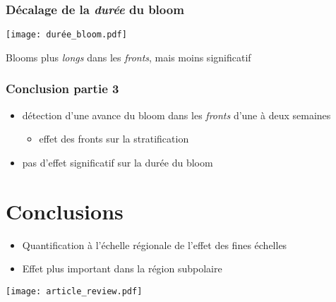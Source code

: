 \documentclass[11pt, french, aspectratio=32]{beamer}
\begin{document}

\begin{frame}
  \frametitle{Décalage de la \emph{\textit{durée}} du bloom}
  \texttt{[image: durée\_bloom.pdf]}

  \vfill

  Blooms plus \emph{longs} dans les \emph{fronts}, mais moins significatif
\end{frame}


\begin{frame}
  \frametitle{Conclusion partie 3}
  \vfill
  \begin{itemize}
          \setlength{\itemsep}{3em}
    \item détection d'une avance du bloom dans les \emph{fronts} d'une à deux semaines
          \begin{itemize}
            \item effet des fronts sur la stratification
          \end{itemize}
    \item pas d'effet significatif sur la durée du bloom
  \end{itemize}
  \vfill
\end{frame}


\section{Conclusions}

\begin{frame}

  \begin{itemize}
    \item Quantification à l'échelle régionale de l'effet des fines échelles
    \item Effet plus important dans la région subpolaire
  \end{itemize}

  \texttt{[image: article\_review.pdf]}
\end{frame}
\end{document}
